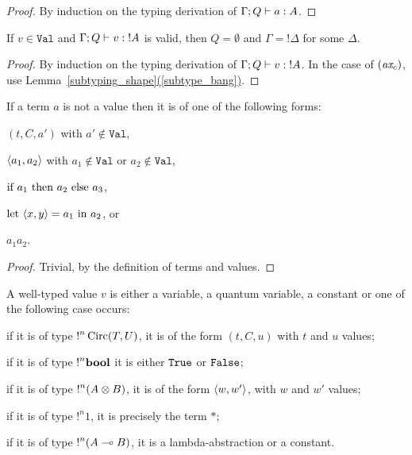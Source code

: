 \documentclass[twoside]{article}
\begin{document}
\begin{proof}
By induction on the typing derivation of $\Gamma;Q \vdash a:A$.
\end{proof}

\begin{lemma}
\label{context_value}
If $v\in\mathtt{Val}$ and $\Gamma;Q \vdash v:{!}A$ is valid, 
then $Q=\emptyset$ and $\Gamma={!}\Delta$ for some $\Delta$.
\end{lemma}

\begin{proof}
By induction on the typing derivation of $\Gamma;Q \vdash v:{!}A$. 
In the case of $(\textit{ax}_c)$, use Lemma~\hyperref[subtype_bang]{\ref*{subtyping_shape}(\ref*{subtype_bang})}.
\end{proof}

\begin{lemma}
\label{non_values}
If a term $a$ is not a value then it is of one 
of the following forms: 
\begin{compactitemize}
\item $(t,C,a')$ with $a'\notin \mathtt{Val}$, 
\item $\langle a_1,a_2\rangle$ with $a_1\notin \mathtt{Val}$ or $a_2\notin
  \mathtt{Val}$, 
\item $\textrm{\rm if}~ a_1 ~\textrm{\rm then}~ a_2 ~\textrm{\rm else}~ a_3$,
\item $\textrm{\rm let}~ \langle x,y\rangle = a_1 ~\textrm{\rm in}~ a_2$, or
\item $a_1a_2$.
\end{compactitemize}
\end{lemma}

\begin{proof}
Trivial, by the definition of terms and values.
\end{proof}

\begin{lemma}
\label{form_values}
A well-typed value $v$ is either a variable, a quantum variable, a constant or one 
of the following case occurs: 
\begin{compactitemize}
\item if it is of type ${!}^n\mathop{\textrm{Circ}}\nolimits(T,U)$, it is of the 
form $(t,C,u)$ with $t$ and $u$ values; 
\item if it is of type ${!}^n\textrm{\bf bool}$ it is either 
$\texttt{True}$ or $\texttt{False}$; 
\item if it is of type ${!}^n (A\otimes B)$, it is of the
form $\langle w,w'\rangle$, with $w$ and $w'$ values; 
\item if it is of type ${!}^n1$, it is 
precisely the term $*$; 
\item if it is of type ${!}^n (A\multimap B)$, it is a 
lambda-abstraction or a constant.
\end{compactitemize}
\end{lemma}
\end{document}
